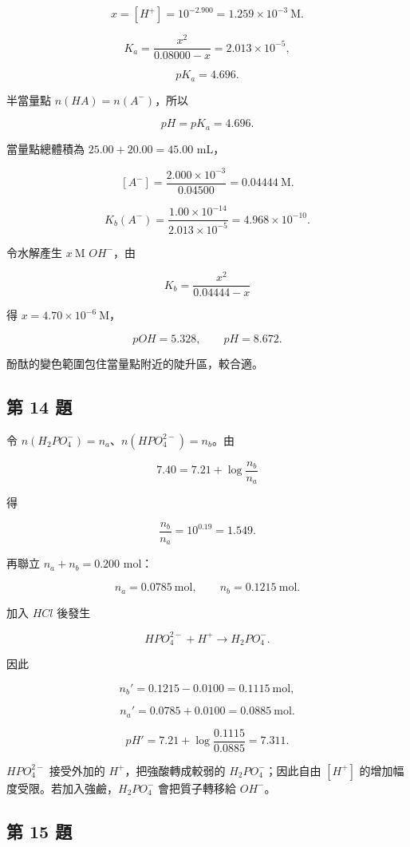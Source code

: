 \documentclass[11pt,a4paper]{article}
\begin{document}
\[
x=[H^+]=10^{-2.900}=1.259\times10^{-3}\ \mathrm M.
\]

\[
K_a=\frac{x^2}{0.08000-x}
=2.013\times10^{-5},
\]

\[
pK_a=4.696.
\]

半當量點 \(n(HA)=n(A^-)\)，所以

\[
pH=pK_a=4.696.
\]

當量點總體積為 \(25.00+20.00=45.00\) mL，

\[
[A^-]=\frac{2.000\times10^{-3}}{0.04500}
=0.04444\ \mathrm M.
\]

\[
K_b(A^-)=\frac{1.00\times10^{-14}}{2.013\times10^{-5}}
=4.968\times10^{-10}.
\]

令水解產生 \(x\ \mathrm M\) \(OH^-\)，由

\[
K_b=\frac{x^2}{0.04444-x}
\]

得 \(x=4.70\times10^{-6}\ \mathrm M\)，

\[
pOH=5.328,\qquad pH=8.672.
\]

酚酞的變色範圍包住當量點附近的陡升區，較合適。

\subsection{第 14 題}\label{ux7b2c-14-ux984c}

令 \(n(H_2PO_4^-)=n_a\)、\(n(HPO_4^{2-})=n_b\)。由

\[
7.40=7.21+\log\frac{n_b}{n_a}
\]

得

\[
\frac{n_b}{n_a}=10^{0.19}=1.549.
\]

再聯立 \(n_a+n_b=0.200\) mol：

\[
n_a=0.0785\ \mathrm{mol},\qquad
n_b=0.1215\ \mathrm{mol}.
\]

加入 \(HCl\) 後發生

\[
HPO_4^{2-}+H^+\rightarrow H_2PO_4^-.
\]

因此

\[
n_b'=0.1215-0.0100=0.1115\ \mathrm{mol},
\]

\[
n_a'=0.0785+0.0100=0.0885\ \mathrm{mol}.
\]

\[
pH'=7.21+\log\frac{0.1115}{0.0885}=7.311.
\]

\(HPO_4^{2-}\) 接受外加的 \(H^+\)，把強酸轉成較弱的 \(H_2PO_4^-\)；因此自由 \([H^+]\) 的增加幅度受限。若加入強鹼，\(H_2PO_4^-\) 會把質子轉移給 \(OH^-\)。

\subsection{第 15 題}\label{ux7b2c-15-ux984c}
\end{document}
